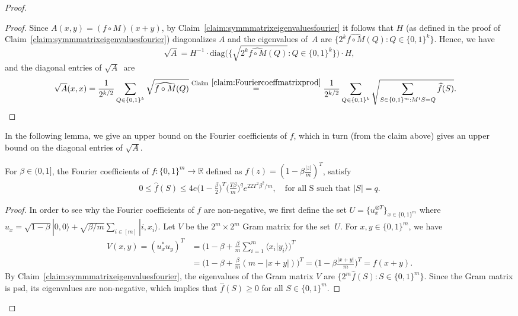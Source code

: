 \documentclass[twoside,11pt]{article}
\newcommand{\ket}[1]{|#1\rangle}
\newcommand{\ip}[2]{\langle #1 | #2 \rangle}
\newcommand{\R}{\ensuremath{\mathbb{R}}}
\def\01{\{0,1\}}
\begin{document}
\begin{proof}
	\begin{proof}
		Since $A(x,y)=(f\circ M)(x+ y)$, by Claim~\ref{claim:symmmatrixeigenvaluesfourier} it follows that $H$ (as defined in the proof of Claim~\ref{claim:symmmatrixeigenvaluesfourier}) diagonalizes $A$ and the eigenvalues of~$A$ are $\{2^k\widehat{f\circ M} (Q):Q\in \01^k\}$. Hence, we have 
		$$
		\sqrt{A}=H^{-1}\cdot \text{diag}\Big(\Big\{\sqrt{2^k\widehat{f\circ M} (Q)}:Q\in \01^k\Big\}\Big)\cdot H,
		$$ 
		and the diagonal entries of $\sqrt{A}$~are
		\begin{align*}
		\sqrt{A}(x,x)&=\frac{1}{2^{k/2}}\sum_{Q\in \01^{k}} \sqrt{ \widehat{f\circ M} (Q)} \stackrel{\text{Claim}~\ref{claim:Fouriercoeffmatrixprod}}{=}\frac{1}{2^{k/2}}\sum_{Q\in \01^{k}} \sqrt{ \sum_{S\in \01^m:M^t S =Q} \widehat{f} (S)}.
		\end{align*}
	\end{proof}
	
	In the following lemma, we give an upper bound on the Fourier coefficients of $f$, which in turn (from the claim above) gives an upper bound on the diagonal entries of $\sqrt{A}$.
	
	\begin{lemma}
		\label{lemma:Fouriercoefficientupperbound}
		For $\beta\in (0,1]$, the Fourier coefficients of $f:\01^m\rightarrow \R$ defined as $f(z)=(1-\beta\frac{|z|}{m} )^T$, satisfy 
		\begin{align*}
		0 \leq  \widehat{f}(S) \leq 4e\Big(1-\frac{\beta}{2}\Big)^T \Big( \frac{T\beta}{m} \Big)^{q}e^{22T^2\beta^2/m}, \quad \text{for all S such that } |S|=q.
		\end{align*}
	\end{lemma}
	
	\begin{proof}
		In order to see why the Fourier coefficients of $f$ are non-negative, we first define the set $U=\{u_x^{\otimes T}\}_{x\in \01^m}$ where $u_x=\sqrt{1-\beta}\ket{0,0}+\sqrt{\beta/m}\sum_{i\in [m]}\ket{i,x_i}$. Let $V$ be the $2^m\times 2^m$ Gram matrix for the set~$U$. For $x,y\in \01^m$, we have
		\begin{align*}
		V(x,y)=(u_x^* u_y)^T&=\Big(1-\beta+\frac{\beta}{m}\sum_{i=1}^m \ip {x_i}{y_i}\Big)^T\\
		&=\Big(1-\beta+\frac{\beta}{m}(m-|x+ y|)\Big)^T=\Big(1-\beta\frac{|x+ y|}{m} \Big)^T =f(x+ y).
		\end{align*}
		By Claim~\ref{claim:symmmatrixeigenvaluesfourier}, the eigenvalues of the Gram matrix $V$ are $\{2^m\widehat{f}(S):S\in \01^m\}$. Since the Gram matrix is psd, its eigenvalues are non-negative, which implies that $\widehat{f}(S)\geq 0$ for all $S\in \01^m$.
		

\end{proof}
\end{proof}
\end{document}
